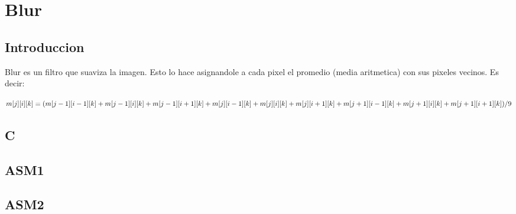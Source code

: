 \section{Blur}

\subsection{Introduccion}
Blur es un filtro que suaviza la imagen. Esto lo hace asignandole a cada pixel el promedio (media aritmetica) con sus pixeles vecinos. Es decir:

$m[j][i][k] = (m[j-1][i-1][k] + m[j-1][i][k] + m[j-1][i+1][k] + \\
m[j] [i-1][k] + m[j] [i][k] + m[j] [i+1][k] + \\
m[j+1][i-1][k] + m[j+1][i][k] + m[j+1][i+1][k] ) / 9$


\subsection{C}

\subsection{ASM1}

\subsection{ASM2}

